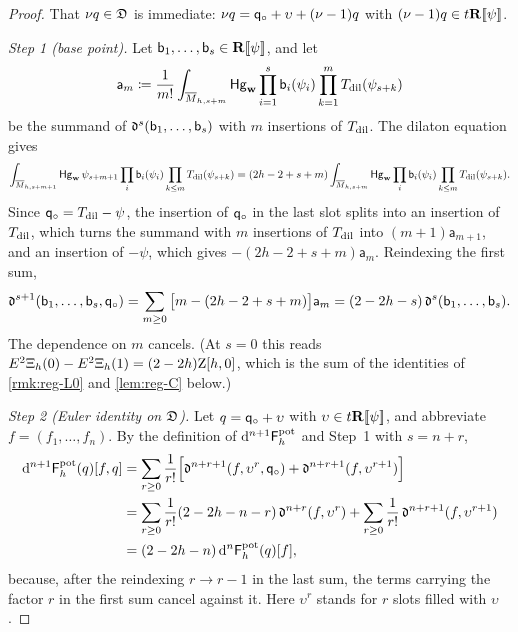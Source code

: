 \begin{proof}
That $\nu q\in\mathfrak{D}$ is immediate: $\nu q=\mathsf{q}_{\circ}+\upsilon+(\nu-1)q$ with $(\nu-1)q\in t\mathbf{R}[\![ \psi ]\!]$.

\emph{Step 1 (base point).} Let $\mathsf{b}_1,\dots,\mathsf{b}_s\in\mathbf{R}[\![ \psi ]\!]$, and let
\[
\mathsf{a}_m\coloneqq\frac{1}{m!}\int_{\overline{M}_{h,s+m}}\mathsf{Hg}_{\mathbf{w}}\prod_{i=1}^s\mathsf{b}_i(\psi_i)\prod_{k=1}^{m}T_{\mathrm{dil}}(\psi_{s+k})
\]
be the summand of $\mathfrak{d}^s(\mathsf{b}_1,\dots,\mathsf{b}_s)$ with $m$ insertions of $T_{\mathrm{dil}}$. The dilaton equation gives
\[
\int_{\overline{M}_{h,s+m+1}}\mathsf{Hg}_{\mathbf{w}}\,\psi_{s+m+1}\prod_{i}\mathsf{b}_i(\psi_i)\prod_{k\leq m}T_{\mathrm{dil}}(\psi_{s+k})=(2h-2+s+m)\int_{\overline{M}_{h,s+m}}\mathsf{Hg}_{\mathbf{w}}\prod_i\mathsf{b}_i(\psi_i)\prod_{k\leq m}T_{\mathrm{dil}}(\psi_{s+k}).
\]
Since $\mathsf{q}_{\circ}=T_{\mathrm{dil}}-\psi$, the insertion of $\mathsf{q}_{\circ}$ in the last slot splits into an insertion of $T_{\mathrm{dil}}$, which turns the summand with $m$ insertions of $T_{\mathrm{dil}}$ into $(m+1)\mathsf{a}_{m+1}$, and an insertion of $-\psi$, which gives $-(2h-2+s+m)\mathsf{a}_m$. Reindexing the first sum,
\[
\mathfrak{d}^{s+1}(\mathsf{b}_1,\dots,\mathsf{b}_s,\mathsf{q}_{\circ})=\sum_{m\geq 0}\big[m-(2h-2+s+m)\big]\mathsf{a}_m=(2-2h-s)\,\mathfrak{d}^s(\mathsf{b}_1,\dots,\mathsf{b}_s).
\]
The dependence on $m$ cancels. (At $s=0$ this reads $E^2\Xi_h(0)-E^2\Xi_h(1)=(2-2h)\mathrm{Z}[h,0]$, which is the sum of the identities of \cref{rmk:reg-L0} and \cref{lem:reg-C} below.)

\emph{Step 2 (Euler identity on $\mathfrak{D}$).} Let $q=\mathsf{q}_{\circ}+\upsilon$ with $\upsilon\in t\mathbf{R}[\![ \psi ]\!]$, and abbreviate $f=(f_1,\dots,f_n)$. By the definition of $\mathrm{d}^{n+1}\mathsf{F}^{\mathrm{pot}}_h$ and Step~1 with $s=n+r$,
\begin{align*}
\mathrm{d}^{n+1}\mathsf{F}^{\mathrm{pot}}_h(q)[f,q]
&=\sum_{r\geq 0}\frac{1}{r!}\Big[\mathfrak{d}^{n+r+1}(f,\upsilon^{r},\mathsf{q}_{\circ})+\mathfrak{d}^{n+r+1}(f,\upsilon^{r+1})\Big]\\
&=\sum_{r\geq 0}\frac{1}{r!}(2-2h-n-r)\,\mathfrak{d}^{n+r}(f,\upsilon^{r})+\sum_{r\geq 0}\frac{1}{r!}\,\mathfrak{d}^{n+r+1}(f,\upsilon^{r+1})\\
&=(2-2h-n)\,\mathrm{d}^n\mathsf{F}^{\mathrm{pot}}_h(q)[f],
\end{align*}
because, after the reindexing $r\to r-1$ in the last sum, the terms carrying the factor $r$ in the first sum cancel against it. Here $\upsilon^r$ stands for $r$ slots filled with $\upsilon$.


\end{proof}
